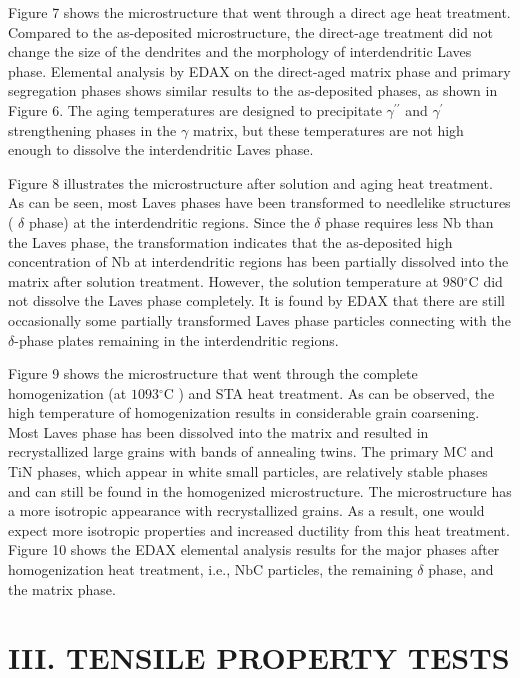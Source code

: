 \documentclass[10pt]{article}
\begin{document}
Figure 7 shows the microstructure that went through a direct age heat treatment. Compared to the as-deposited microstructure, the direct-age treatment did not change the size of the dendrites and the morphology of interdendritic Laves phase. Elemental analysis by EDAX on the direct-aged matrix phase and primary segregation phases shows similar results to the as-deposited phases, as shown in Figure 6. The aging temperatures are designed to precipitate $\gamma^{\prime \prime}$ and $\gamma^{\prime}$ strengthening phases in the $\gamma$ matrix, but these temperatures are not high enough to dissolve the interdendritic Laves phase.

Figure 8 illustrates the microstructure after solution and aging heat treatment. As can be seen, most Laves phases have been transformed to needlelike structures ( $\delta$ phase) at the interdendritic regions. Since the $\delta$ phase requires less $\mathrm{Nb}$ than the Laves phase, the transformation indicates that the as-deposited high concentration of $\mathrm{Nb}$ at interdendritic regions has been partially dissolved into the matrix after solution treatment. However, the solution temperature at $980{ }^{\circ} \mathrm{C}$ did not dissolve the Laves phase completely. It is found by EDAX that there are still occasionally some partially transformed Laves phase particles connecting with the $\delta$-phase plates remaining in the interdendritic regions.

Figure 9 shows the microstructure that went through the complete homogenization (at $1093{ }^{\circ} \mathrm{C}$ ) and STA heat treatment. As can be observed, the high temperature of homogenization results in considerable grain coarsening. Most Laves phase has been dissolved into the matrix and resulted in recrystallized large grains with bands of annealing twins. The primary MC and TiN phases, which appear in white small particles, are relatively stable phases and can still be found in the homogenized microstructure. The microstructure has a more isotropic appearance with recrystallized grains. As a result, one would expect more isotropic properties and increased ductility from this heat treatment. Figure 10 shows the EDAX elemental analysis results for the major phases after homogenization heat treatment, i.e., $\mathrm{NbC}$ particles, the remaining $\delta$ phase, and the matrix phase.

\section*{III. TENSILE PROPERTY TESTS}
\end{document}
